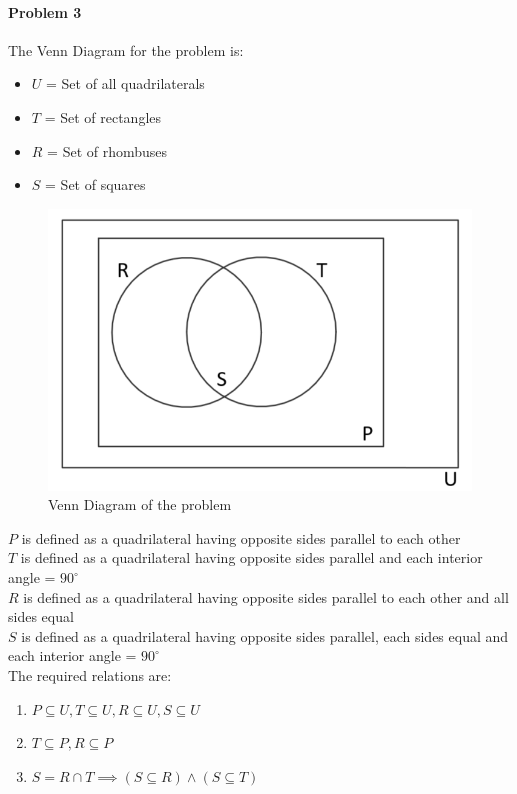 \documentclass[12pt]{scrartcl}
\begin{document}
\paragraph*{Problem 3}
The Venn Diagram for the problem is:
\begin{itemize}
    \item $U$ = Set of all quadrilaterals
    \item $T$ = Set of rectangles
    \item $R$ = Set of rhombuses
    \item $S$ = Set of squares
\end{itemize}
\begin{figure}[h!]
    \centering
    \includegraphics{venn_assgn1.png}
    \caption[width=\linewidth]{Venn Diagram of the problem}
    \label{fig:my_label}
\end{figure}
\vspace{2mm}
$P$ is defined as a quadrilateral having opposite sides parallel to each other\\
$T$ is defined as a quadrilateral having opposite sides parallel and each interior angle = $90^\circ$ \\ 
$R$ is defined as a quadrilateral having opposite sides parallel to each other and all sides equal\\
$S$ is defined as a quadrilateral having opposite sides parallel, each sides equal and each interior angle = $90^\circ$ \\

The required relations are:
\begin{enumerate}
    \item $P \subseteq U, T \subseteq U, R \subseteq U, S \subseteq U$ 
    \item $T \subseteq P, R \subseteq P$
    \item $S = R \cap T \implies (S \subseteq R) \wedge (S \subseteq T)$
\end{enumerate}
\end{document}
